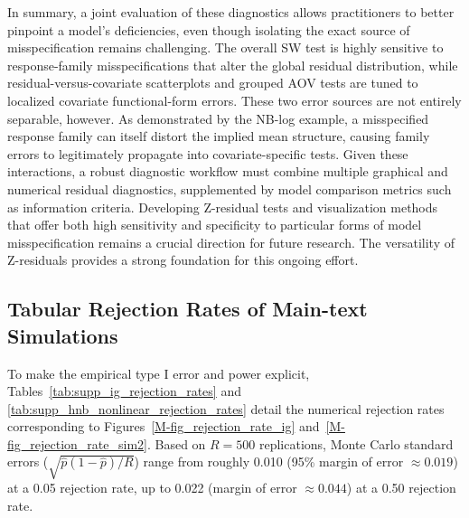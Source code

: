 \documentclass[
  12pt]{article}
\theoremstyle{plain}
\theoremstyle{definition}
\theoremstyle{remark}
\begin{document}
In summary, a joint evaluation of these diagnostics allows practitioners to better pinpoint a model's deficiencies, even though isolating the exact source of misspecification remains challenging. The overall SW test is highly sensitive to response-family misspecifications that alter the global residual distribution, while residual-versus-covariate scatterplots and grouped AOV tests are tuned to localized covariate functional-form errors. These two error sources are not entirely separable, however. As demonstrated by the NB-log example, a misspecified response family can itself distort the implied mean structure, causing family errors to legitimately propagate into covariate-specific tests. Given these interactions, a robust diagnostic workflow must combine multiple graphical and numerical residual diagnostics, supplemented by model comparison metrics such as information criteria. Developing Z-residual tests and visualization methods that offer both high sensitivity and specificity to particular forms of model misspecification remains a crucial direction for future research. The versatility of Z-residuals provides a strong foundation for this ongoing effort.

\clearpage

\subsection{Tabular Rejection Rates of Main-text Simulations}

To make the empirical type I error and power explicit, Tables~\ref{tab:supp_ig_rejection_rates} and \ref{tab:supp_hnb_nonlinear_rejection_rates} detail the numerical rejection rates corresponding to Figures~\ref{M-fig_rejection_rate_ig} and~\ref{M-fig_rejection_rate_sim2}. Based on $R=500$ replications, Monte Carlo standard errors ($\sqrt{\hat p(1-\hat p)/R}$) range from roughly 0.010 (95\% margin of error $\approx 0.019$) at a 0.05 rejection rate, up to 0.022 (margin of error $\approx 0.044$) at a 0.50 rejection rate.
\end{document}

